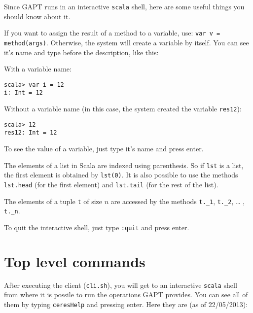 \documentclass[a4paper, 11pt]{report}
\begin{document}
Since GAPT runs in an interactive \texttt{scala} shell, here are some useful things you
should know about it.

If you want to assign the result of a method to a variable, use: 
\texttt{var v = method(args)}. Otherwise, the system will create a variable by 
itself. You can see it's name and type before the description, like this:

With a variable name:

\begin{lstlisting}
scala> var i = 12
i: Int = 12
\end{lstlisting}

Without a variable name (in this case, the system created the variable \texttt{res12}):

\begin{lstlisting}
scala> 12
res12: Int = 12
\end{lstlisting}

To see the value of a variable, just type it’s name and press enter.

The elements of a list in Scala are indexed using parenthesis. So if \texttt{lst} 
is a list, the first element is obtained by \texttt{lst(0)}. It is also possible 
to use the methods \texttt{lst.head} (for the first element) and \texttt{lst.tail} 
(for the rest of the list).

The elements of a tuple \texttt{t} of size $n$ are accessed by the methods 
\texttt{t.\_1}, \texttt{t.\_2}, … , \texttt{t.\_n}.

To quit the interactive shell, just type \texttt{:quit} and press enter.

\section{Top level commands}

After executing the client (\texttt{cli.sh}), you will get to an interactive \texttt{scala} shell 
from where it is possile to run the operations GAPT provides. You can see all of
them by typing \texttt{ceresHelp} and pressing enter. Here they are (as of
22/05/2013):
\end{document}
